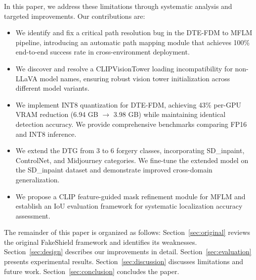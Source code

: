 In this paper, we address these limitations through systematic analysis and targeted improvements. Our contributions are:

\begin{itemize}
    \item We identify and fix a critical path resolution bug in the DTE-FDM to MFLM pipeline, introducing an automatic path mapping module that achieves 100\% end-to-end success rate in cross-environment deployment.
    \item We discover and resolve a CLIPVisionTower loading incompatibility for non-LLaVA model names, ensuring robust vision tower initialization across different model variants.
    \item We implement INT8 quantization for DTE-FDM, achieving 43\% per-GPU VRAM reduction (6.94 GB $\rightarrow$ 3.98 GB) while maintaining identical detection accuracy. We provide comprehensive benchmarks comparing FP16 and INT8 inference.
    \item We extend the DTG from 3 to 6 forgery classes, incorporating SD\_inpaint, ControlNet, and Midjourney categories. We fine-tune the extended model on the SD\_inpaint dataset and demonstrate improved cross-domain generalization.
    \item We propose a CLIP feature-guided mask refinement module for MFLM and establish an IoU evaluation framework for systematic localization accuracy assessment.
\end{itemize}

The remainder of this paper is organized as follows: Section~\ref{sec:original} reviews the original FakeShield framework and identifies its weaknesses. Section~\ref{sec:design} describes our improvements in detail. Section~\ref{sec:evaluation} presents experimental results. Section~\ref{sec:discussion} discusses limitations and future work. Section~\ref{sec:conclusion} concludes the paper.
